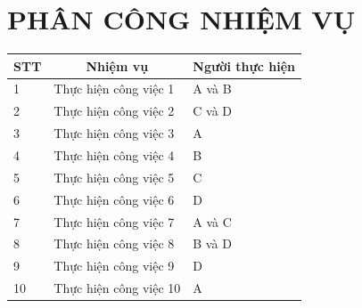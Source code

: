 \section*{PHÂN CÔNG NHIỆM VỤ}
 {}

\begin{table}[!ht]
\begin{tabular}{|l|l|l|}
\hline
\multicolumn{1}{|c|}{\textbf{STT}} & \multicolumn{1}{c|}{\textbf{Nhiệm vụ}}                  & \multicolumn{1}{c|}{\textbf{Người thực hiện}} \\ \hline
1 & Thực hiện công việc 1  & A và B  \\ \hline
2 & Thực hiện công việc 2  & C và D  \\ \hline
3 & Thực hiện công việc 3  & A  \\ \hline
4 & Thực hiện công việc 4 & B  \\ \hline
5 & Thực hiện công việc 5  & C \\ \hline
6 & Thực hiện công việc 6  & D  \\ \hline
7 & Thực hiện công việc 7 & A và C \\ \hline
8 & Thực hiện công việc 8   & B và D  \\ \hline
9 & Thực hiện công việc 9  & D \\ \hline
10 & Thực hiện công việc 10  & A\\ \hline
\end{tabular}
\end{table}

\newpage